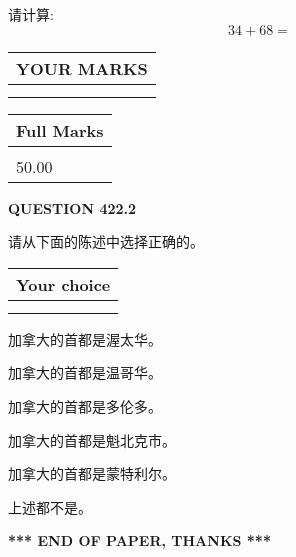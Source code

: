\documentclass{ctexart}
\begin{document}
  
 
请计算:
\begin{equation}
34 +  %
68 = \nonumber
\end{equation}
 

 

 
  
\vspace{0.2in}
  
\noindent\begin{tabular}{|l|}
\hline
 YOUR MARKS  \\
\hline
 \\ 
 \\ 
\hline
\end{tabular}
\hspace{0.05in} \begin{tabular}{|l|}
\hline
 Full Marks  \\
\hline
 \\ 
50.00 \\
\hline
\end{tabular}
{\textbf{\Large{QUESTION
422.2 
}}}
  
  
请从下面的陈述中选择正确的。
  
  
\noindent\hspace{3.0in} \begin{tabular}{|l|}
\hline
Your choice \\
\hline
 \\ 
 \\ 
\hline
\end{tabular}
  
  
 
 
加拿大的首都是渥太华。
 
 
加拿大的首都是温哥华。
 
 
加拿大的首都是多伦多。
 
 
加拿大的首都是魁北克市。
 
 
加拿大的首都是蒙特利尔。
 
 
 上述都不是。
 
 
   
   
 \vspace{0.2in}
 
   
   
   
   
\vspace{1.0in} 
{\textbf{\large{ *** END OF PAPER, THANKS *** }}} 
   
\end{document}
